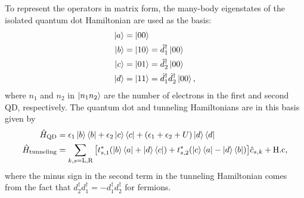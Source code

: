 \documentclass[../main.tex]{subfiles}
\begin{document}
To represent the operators in matrix form, the many-body eigenstates of the isolated quantum dot Hamiltonian are used as the basis:
\begin{equation}\label{eq:basis}
    \begin{aligned}
        \ket{a} &= \ket{00} \\
        \ket{b} &= \ket{10} = \hat d_1^\dag\ket{00}\\
        \ket{c} &= \ket{01} = \hat d_2^\dag\ket{00}\\
        \ket{d} &= \ket{11} = \hat d_1^\dag\hat d_2^\dag\ket{00},\\
    \end{aligned}
\end{equation}
where $n_1$ and $n_2$ in $\ket{n_1n_2}$ are the number of electrons in the first and second QD, respectively. The quantum dot and tunneling Hamiltonians are in this basis given by
\begin{equation}
    \begin{aligned}
        \hat H_\text{QD} &= \epsilon_1\ket{b}\bra{b} + \epsilon_2\ket{c}\bra{c} + (\epsilon_1 + \epsilon_2 + U)\ket{d}\bra{d} \\
        \hat H_\text{tunneling} &= \sum_{k,s=\text{L,R}} \big[t_{s,1}^*(\ket{b}\bra{a} + \ket{d}\bra{c}) + t_{s,2}^*(\ket{c}\bra{a} - \ket{d}\bra{b})\big]\hat c_{s,k} + \text{H.c},
    \end{aligned}
\end{equation}
where the minus sign in the second term in the tunneling Hamiltonian comes from the fact that $d_2^\dag d_1^\dag = - d_1^\dag d_2^\dag$ for fermions.
\end{document}
